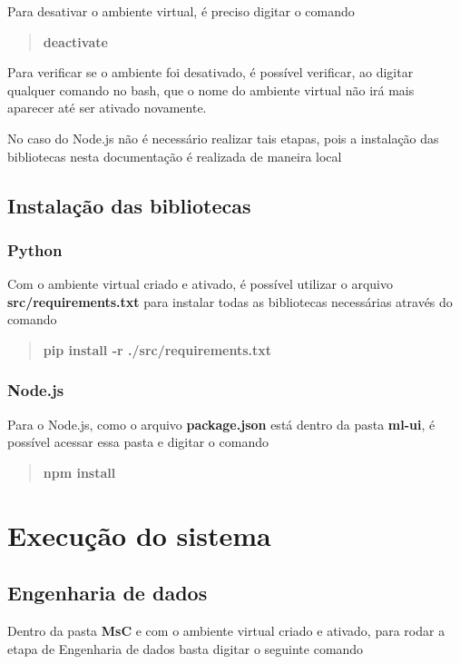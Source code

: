 \documentclass[letterpaper]{article}
\begin{document}
Para desativar o ambiente virtual, é preciso digitar o comando

\begin{quote}\textbf{deactivate}\end{quote}

Para verificar se o ambiente foi desativado, é possível verificar, ao digitar qualquer comando no bash, que o nome do ambiente virtual não irá mais aparecer até ser ativado novamente.

No caso do Node.js não é necessário realizar tais etapas, pois a instalação das bibliotecas nesta documentação é realizada de maneira local

\subsection{Instalação das bibliotecas}

\subsubsection{Python}

Com o ambiente virtual criado e ativado, é possível utilizar o arquivo \textbf{src/requirements.txt} para instalar todas as bibliotecas necessárias através do comando

\begin{quote}\textbf{pip install -r ./src/requirements.txt}\end{quote}

\subsubsection{Node.js}

Para o Node.js, como o arquivo \textbf{package.json} está dentro da pasta \textbf{ml-ui}, é possível acessar essa pasta e digitar o comando

\begin{quote}\textbf{npm install}\end{quote}

\section{Execução do sistema}

\subsection{Engenharia de dados}

Dentro da pasta \textbf{MsC} e com o ambiente virtual criado e ativado, para rodar a etapa de Engenharia de dados basta digitar o seguinte comando
\end{document}
